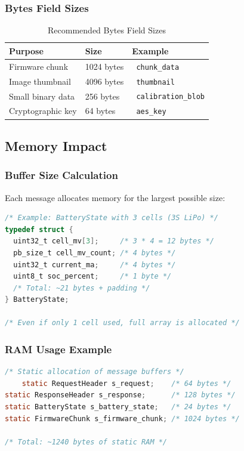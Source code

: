 \subsubsection{Bytes Field Sizes}

\begin{table}[H]
\centering
\caption{Recommended Bytes Field Sizes}
\label{tab:bytes-sizes}
\begin{tabular} { | l | l | l |}
\hline
\textbf{Purpose} & \textbf{Size} & \textbf{Example}
\\
\hline Firmware chunk & 1024 bytes & \texttt { chunk\_data}
\\
\hline Image thumbnail & 4096 bytes & \texttt { thumbnail}
\\
\hline Small binary data & 256 bytes & \texttt { calibration\_blob}
\\
\hline Cryptographic key & 64 bytes & \texttt { aes\_key}
\\
\hline
\end{tabular}
\end{table}

\subsection{Memory Impact}

\subsubsection{Buffer Size Calculation}

Each message allocates memory for the largest possible size:

\begin{lstlisting}[language=C]
/* Example: BatteryState with 3 cells (3S LiPo) */
typedef struct {
  uint32_t cell_mv[3];     /* 3 * 4 = 12 bytes */
  pb_size_t cell_mv_count; /* 4 bytes */
  uint32_t current_ma;     /* 4 bytes */
  uint8_t soc_percent;     /* 1 byte */
  /* Total: ~21 bytes + padding */
} BatteryState;

/* Even if only 1 cell used, full array is allocated */

\end{lstlisting}
\subsubsection{RAM Usage Example}

\begin{lstlisting}[language = C]
    /* Static allocation of message buffers */
    static RequestHeader s_request;    /* 64 bytes */
static ResponseHeader s_response;      /* 128 bytes */
static BatteryState s_battery_state;   /* 24 bytes */
static FirmwareChunk s_firmware_chunk; /* 1024 bytes */

/* Total: ~1240 bytes of static RAM */

\end{lstlisting}
